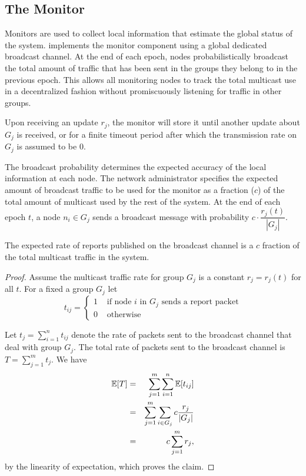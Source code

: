 \subsection{The Monitor}
Monitors are used to collect local information that estimate the global status of the system. \sysname{} implements the monitor component using a global dedicated broadcast channel. At the end of each epoch, nodes probabilistically broadcast the total amount of traffic that has been sent in the groups they belong to in the previous epoch. This allows all monitoring nodes to track the total multicast use in a decentralized fashion without promiscuously listening for traffic in other groups.

Upon receiving an update $r_j$, the monitor will store it until another update about $G_j$ is received, or for a finite timeout period after which the transmission rate on $G_j$ is assumed to be 0.

The broadcast probability determines the expected accuracy of the local information at each node. The network administrator specifies the expected amount of broadcast traffic to be used for the monitor as a fraction ($c$) of the total amount of multicast used by the rest of the system. At the end of each epoch $t$, a node $n_i \in G_j$ sends a broadcast message with probability $c \cdot \dfrac{r_j(t)}{|G_j|}$.

\begin{claim}
The expected rate of reports published on the broadcast channel is a $c$ fraction of the total multicast traffic in the system.
\end{claim}

\begin{proof}
Assume the multicast traffic rate for group $G_j$ is a constant $r_j = r_j(t)$ for all $t$.
For a fixed a group $G_j$ let
\[
t_{ij} = \left\lbrace \begin{array}{ll} 1 & \textrm{ if node $i$ in $G_j$ sends a report packet} \\
0 & \textrm{ otherwise} \end{array} \right.
\]

Let $t_j = \sum_{i=1}^n t_{ij}$ denote the rate of packets sent to the broadcast channel that deal with group $G_j$. The total rate of packets sent to the broadcast channel is $T = \sum_{j=1}^m t_j$. We have
\begin{eqnarray*}
\mathbb{E}[T] &=& \sum_{j=1}^m \sum_{i=1}^n \mathbb{E}[t_{ij}] \\
&=& \sum_{j=1}^m \sum_{i \in G_j} c \frac{r_j}{|G_j|}  \\
&=& c \sum_{j=1}^m r_j,
\end{eqnarray*}
by the linearity of expectation, which proves the claim.
\end{proof}


